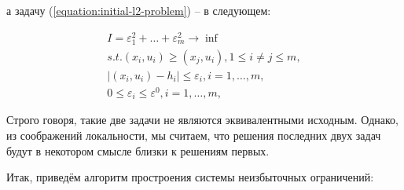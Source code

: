 \documentclass[a4paper, 10pt]{article}
\theoremstyle{definition}
\theoremstyle{plain}
\theoremstyle{plain}
\begin{document}
а задачу (\ref{equation:initial-l2-problem}) -- в следующем:

\begin{equation}
\label{equation:reduced-l1-problem}
\begin{split}
 I = \varepsilon_{1}^{2} + \ldots + \varepsilon_{m}^{2} \to \inf \\
 s. t. (x_{i}, u_{i}) \geq (x_{j}, u_{i}), 1 \leq i \neq j \leq m, \\
 | (x_{i}, u_{i}) - h_{i} | \leq \varepsilon_{i}, i = 1, \ldots, m, \\
 0 \leq \varepsilon_{i} \leq \varepsilon^{0}, i = 1, \ldots, m,
\end{split}
\end{equation}

Строго говоря, такие две задачи не являются эквивалентными исходным. Однако,
из соображений локальности, мы считаем, что решения последних двух задач будут
в некотором смысле близки к решениям первых.

Итак, приведём алгоритм простроения системы неизбыточных ограничений:
\end{document}
